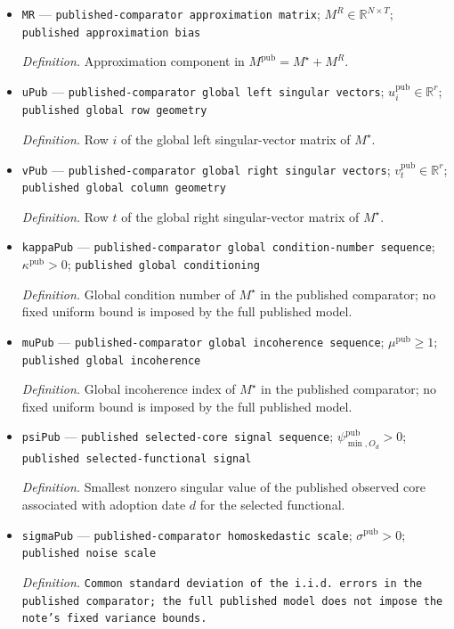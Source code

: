\documentclass{article}
\begin{document}
\begin{itemize}
  \item \texttt{MR} --- \texttt{published-\allowbreak{}comparator approximation matrix}; \(M^R\in\mathbb R^{N\times T}\); \texttt{published approximation bias}
  \par\smallskip\noindent\emph{Definition.} Approximation component in \(M^{\mathrm{pub}}=M^\star+M^R\).
  \item \texttt{uPub} --- \texttt{published-\allowbreak{}comparator global left singular vectors}; \(u_i^{\mathrm{pub}}\in\mathbb R^r\); \texttt{published global row geometry}
  \par\smallskip\noindent\emph{Definition.} Row \(i\) of the global left singular-vector matrix of \(M^\star\).
  \item \texttt{vPub} --- \texttt{published-\allowbreak{}comparator global right singular vectors}; \(v_t^{\mathrm{pub}}\in\mathbb R^r\); \texttt{published global column geometry}
  \par\smallskip\noindent\emph{Definition.} Row \(t\) of the global right singular-vector matrix of \(M^\star\).
  \item \texttt{kappaPub} --- \texttt{published-\allowbreak{}comparator global condition-\allowbreak{}number sequence}; \(\kappa^{\mathrm{pub}}>0\); \texttt{published global conditioning}
  \par\smallskip\noindent\emph{Definition.} Global condition number of \(M^\star\) in the published comparator; no fixed uniform bound is imposed by the full published model.
  \item \texttt{muPub} --- \texttt{published-\allowbreak{}comparator global incoherence sequence}; \(\mu^{\mathrm{pub}}\ge1\); \texttt{published global incoherence}
  \par\smallskip\noindent\emph{Definition.} Global incoherence index of \(M^\star\) in the published comparator; no fixed uniform bound is imposed by the full published model.
  \item \texttt{psiPub} --- \texttt{published selected-\allowbreak{}core signal sequence}; \(\psi^{\mathrm{pub}}_{\min,O_d}>0\); \texttt{published selected-\allowbreak{}functional signal}
  \par\smallskip\noindent\emph{Definition.} Smallest nonzero singular value of the published observed core associated with adoption date \(d\) for the selected functional.
  \item \texttt{sigmaPub} --- \texttt{published-\allowbreak{}comparator homoskedastic scale}; \(\sigma^{\mathrm{pub}}>0\); \texttt{published noise scale}
  \par\smallskip\noindent\emph{Definition.} \texttt{Common standard deviation of the i.i.d. errors in the published comparator;\allowbreak{} the full published model does not impose the note's fixed variance bounds.}

\end{itemize}
\end{document}
